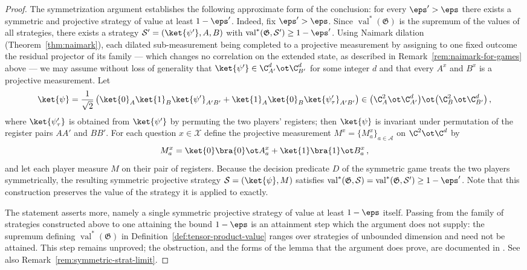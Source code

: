 \begin{proof}
	The symmetrization argument establishes the following approximate form of the conclusion: for every $\eps' > \eps$ there exists a symmetric and projective strategy of value at least $1-\eps'$. Indeed, fix $\eps' > \eps$. Since $\operatorname{val}^*(\mathfrak G)$ is the supremum of the values of all strategies, there exists a strategy $\mathcal S' = (\ket{\psi'}, A, B)$ with $\operatorname{val}^*(\mathfrak G, \mathcal S') \ge 1-\eps'$. Using Naimark dilation (Theorem~\ref{thm:naimark}), each dilated sub-measurement being completed to a projective measurement by assigning to one fixed outcome the residual projector of its family --- which changes no correlation on the extended state, as described in Remark~\ref{rem:naimark-for-games} above --- we may assume without loss of generality that $\ket{\psi'} \in \C^d_{A'} \ot \C^d_{B'}$ for some integer $d$ and that every $A^x$ and $B^x$ is a projective measurement. Let
	\[
		\ket{\psi} = \frac{1}{\sqrt 2}\, \bigl( \ket{0}_{A}\ket{1}_{B}\ket{\psi'}_{A'B'} + \ket{1}_{A}\ket{0}_{B}\ket{\psi'_\tau}_{A'B'} \bigr) \in \bigl(\C^2_{A} \ot \C^d_{A'}\bigr) \ot \bigl(\C^2_{B} \ot \C^d_{B'}\bigr)\,,
	\]
	where $\ket{\psi'_\tau}$ is obtained from $\ket{\psi'}$ by permuting the two players' registers; then $\ket{\psi}$ is invariant under permutation of the register pairs $AA'$ and $BB'$. For each question $x \in \mathcal X$ define the projective measurement $M^x = \{M^x_a\}_{a \in \mathcal A}$ on $\C^2 \ot \C^d$ by
	\[
		M^x_a = \ket{0}\bra{0} \ot A^x_a + \ket{1}\bra{1} \ot B^x_a\,,
	\]
	and let each player measure $M$ on their pair of registers. Because the decision predicate $D$ of the symmetric game treats the two players symmetrically, the resulting symmetric projective strategy $\mathcal S = (\ket{\psi}, M)$ satisfies $\operatorname{val}^*(\mathfrak G, \mathcal S) = \operatorname{val}^*(\mathfrak G, \mathcal S') \ge 1-\eps'$. Note that this construction preserves the value of the strategy it is applied to exactly.

	The statement asserts more, namely a single symmetric projective strategy of value at least $1-\eps$ itself. Passing from the family of strategies constructed above to one attaining the bound $1-\eps$ is an attainment step which the argument does not supply: the supremum defining $\operatorname{val}^*(\mathfrak G)$ in Definition~\ref{def:tensor-product-value} ranges over strategies of unbounded dimension and need not be attained. This step remains unproved; the obstruction, and the forms of the lemma that the argument does prove, are documented in \cite{gap:qpbt_symmetrization-attainment}. See also Remark~\ref{rem:symmetric-strat-limit}.
\end{proof}

